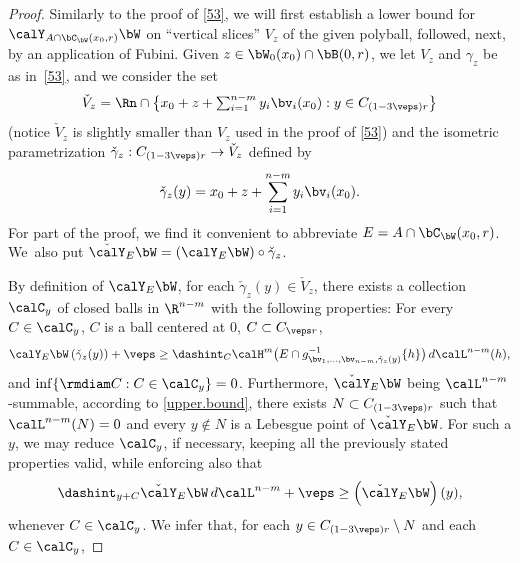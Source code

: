 \begin{proof}
Similarly to the proof of \ref{53}, we will first establish a lower bound for $\calY_{A \cap \bC_\bW(x_0,r)} \bW$ on ``vertical slices'' $V_z$ of the given polyball, followed, next, by an application of Fubini.
Given $z \in \bW_0(x_0) \cap \bB(0,r)$, we let $V_z$ and $\gamma_z$ be as in~\ref{53}, and we consider the set\vspace*{-3pt}
\begin{equation*}
\check{V}_z = \Rn \cap \bigl\{ x_0 + z + \textstyle\sum_{i=1}^{n-m} y_i \bv_i(x_0): y \in C_{(1-3\veps)r}\bigr\}
\end{equation*}
(notice $\check{V}_z$ is slightly smaller than $V_z$ used in the proof of \ref{53}) and the isometric parametrization $\check{\gamma}_z: C_{(1-3\veps)r} \to \check{V}_z$ defined by\vspace*{-3pt}
\begin{equation*}
\check{\gamma}_z(y) = x_0 + z + \sum_{i=1}^{n-m} y_i \bv_i(x_0).
\end{equation*}
For part of the proof, we find it convenient to abbreviate $E = A \cap \bC_\bW(x_0,r)$.
We~also put $\check {\calY}_{E} \bW = \left(\calY_{E} \bW \right) \circ \check{\gamma}_z$.
\par
By definition of $\calY_E \bW$, for each $\check{\gamma}_z(y) \in \check{V}_z$, there exists a collection $\calC_y$ of closed balls in $\R^{n-m}$ with the following properties: For every $C \in \calC_y$, $C$ is a ball centered at 0, $C \subset C_{\veps r}$,\vspace*{-3pt}
\begin{equation*}
\calY_E \bW \left(\check{\gamma}_z(y) \right) + \veps \geq \dashint_C \calH^m \bigl(E \cap g_{\bv_1,\ldots,\bv_{n-m},\check{\gamma}_z(y)}^{-1}\{h\} \bigr) \,d\calL^{n-m}(h),
\end{equation*}
and $\inf \{ \rmdiam C: C \in \calC_y \} = 0$.
Furthermore, $\check{\calY}_E \bW$ being $\calL^{n-m}$-summable, according to \ref{upper.bound}, there exists $N \subset C_{(1-3\veps)r}$ such that $\calL^{n-m}(N)=0$ and every $y \not \in N$ is a Lebesgue point of $\check{\calY}_E \bW$.
For such a $y$, we may reduce $\calC_y$, if necessary, keeping all the previously stated properties valid, while enforcing also that
\begin{equation*}
\dashint_{y+C} \check{\calY}_E \bW \,d\calL^{n-m} + \veps \geq \left(\check{\calY}_E \bW \right)(y),
\end{equation*}
whenever $C \in \calC_y$.
We infer that, for each $y \in C_{(1-3\veps)r} \setminus N$ and each $C \in \calC_y$,\vspace*{-5pt}

\end{proof}
